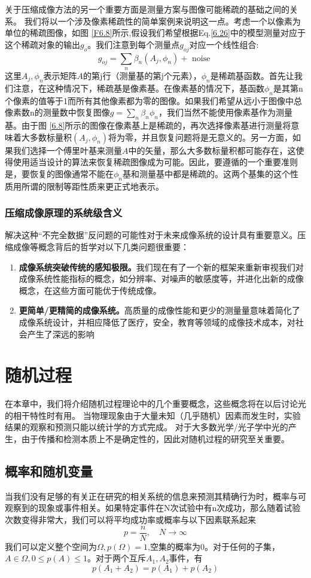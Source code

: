 \documentclass[12pt, UTF8]{ctexart}%
\numberwithin{equation}{section}
\numberwithin{figure}{section}
\newcommand{\InsertEqution}[2]{\begin{equation}
  \label{#1}
   #2
 \end{equation}}
\newcommand{\RefEq}[1]{Eq.\ref{#1}}
\newcommand{\InsertInlineEq}[1]{$#1$}
\newcommand{\RefFig}[1]{图 \ref{#1}}
\newcommand{\InsertItem}[1]{\begin{enumerate} #1 \end{enumerate}}
\begin{document}
\begin{sloppypar}
关于压缩成像方法的另一个重要方面是测量方案与图像可能稀疏的基础之间的关系。 我们将以一个涉及像素稀疏性的简单案例来说明这一点。考虑一个以像素为单位的稀疏图像，如\RefFig{F6.8}所示,假设我们希望根据\RefEq{6.26}中的模型测量对应于这个稀疏对象的输出\InsertInlineEq{g_o}。我们注意到每个测量点\InsertInlineEq{g_{oj}}对应一个线性组合:
\InsertEqution{6.28}{g_{o j}=\sum_{n} \beta_{n}\left(A_{j}, \phi_{n}\right)+\text { noise }}
这里\InsertInlineEq{A_j,\phi_n}表示矩阵\InsertInlineEq{A}的第j行（测量基的第j个元素），\InsertInlineEq{\phi_n}是稀疏基函数。首先让我们注意，在这种情况下，稀疏基是像素基。在像素基的情况下，基函数\InsertInlineEq{\phi_n}是其第n个像素的值等于1而所有其他像素都为零的图像。如果我们希望从远小于图像中总像素数n的测量数中恢复图像\InsertInlineEq{g=\sum_n\beta_n\phi_n}，我们当然不能使用像素基作为测量基。由于\RefFig{6.8}所示的图像在像素基上是稀疏的，再次选择像素基进行测量将意味着大多数标量积\InsertInlineEq{(A_j,\phi_n)}将为零，并且恢复问题将是无意义的。另一方面，如果我们选择一个傅里叶基来测量\InsertInlineEq{A}中的矢量，那么大多数标量积都可能存在，这使得使用适当设计的算法来恢复稀疏图像成为可能。因此，要遵循的一个重要准则是，要恢复的图像通常不能在\InsertInlineEq{\phi_n}基和测量基中都是稀疏的。这两个基集的这个性质用所谓的限制等距性质来更正式地表示。
\subsubsection{压缩成像原理的系统级含义}
解决这种“不完全数据”反问题的可能性对于未来成像系统的设计具有重要意义。压缩成像等概念背后的哲学对以下几类问题很重要：
\InsertItem{\item \textbf{成像系统突破传统的感知极限。}我们现在有了一个新的框架来重新审视我们对成像系统性能指标的概念，如分辨率、对噪声的敏感度等，并进化出新的成像概念，在这些方面可能优于传统成像。
\item \textbf{更简单/更精简的成像系统。}高质量的成像性能和更少的测量量意味着简化了成像系统设计，并相应降低了医疗，安全，教育等领域的成像技术成本，对社会产生了深远的影响}

\section{随机过程}
在本章中，我们将介绍随机过程理论中的几个重要概念，这些概念将在以后讨论光的相干特性时有用。 当物理现象由于大量未知（几乎随机）因素而发生时，实验结果的观察和预测只能以统计学的方式完成。 对于大多数光学/光子学中光的产生，由于传播和检测本质上不是确定性的，因此对随机过程的研究至关重要。
\subsection{概率和随机变量}
当我们没有足够的有关正在研究的相关系统的信息来预测其精确行为时，概率与可观察到的现象或事件相关。如果特定事件在N次试验中有n次成功，那么随着试验次数变得非常大，我们可以将平均成功率或概率与以下因素联系起来
\InsertEqution{7.1}{p=\frac{n}{N}, \quad N \rightarrow \infty}
我们可以定义整个空间为\InsertInlineEq{\Omega,p(\Omega)=1},空集的概率为0。对于任何的子集，\InsertInlineEq{A \in \Omega, 0 \leq p(A) \leq 1}。对于两个互斥\InsertInlineEq{A_1,A_2}事件，有
\InsertEqution{7.2}{p\left(A_{1}+A_{2}\right)=p\left(A_{1}\right)+p\left(A_{2}\right)}

\end{sloppypar}
\end{document}
